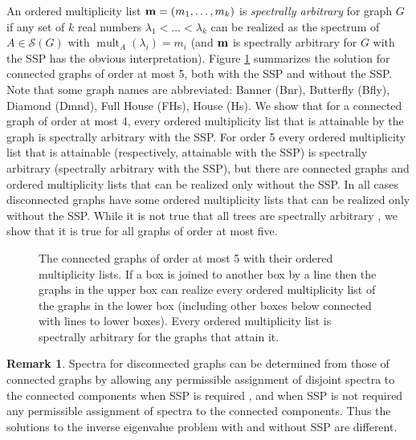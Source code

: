 \documentclass[11pt]{article}
\theoremstyle{definition}
\newtheorem{rem}[thm]{Remark}
\theoremstyle{definition}
\theoremstyle{definition}
\DeclareMathOperator{\mult}{mult}
\newcommand{\oml}{{\bf m}}
\newcommand{\mptn}{\mathcal{S}} %
\begin{document}
An ordered multiplicity list $\oml=(m_1,\dots,m_k)$ is {\em spectrally arbitrary} for graph $G$ if any set of $k$ real numbers $\lambda_1<\dots < \lambda_k$ can be realized as the spectrum of $A\in\mptn(G)$ with $\mult_A(\lambda_i)=m_i$  
(and $\oml$   is spectrally arbitrary for $G$ with the SSP has the obvious interpretation).  Figure \ref{fig:diagram} summarizes the solution for connected graphs of order at most 5, both with the SSP and without the SSP.  Note that some graph names are abbreviated: Banner (Bnr), Butterfly (Bfly), Diamond (Dmnd), Full House (FHs), House (Hs).  We show that for a connected graph of order  at most 4, every ordered multiplicity list that is attainable by the graph is spectrally arbitrary with the SSP.  For order 5 every ordered multiplicity list that is attainable (respectively, attainable with the SSP) is spectrally arbitrary (spectrally arbitrary with the SSP), but there are connected graphs and ordered multiplicity lists that can be realized only without the SSP.  In all cases disconnected graphs have some ordered multiplicity lists that can be realized only without the SSP.
While it is not true that all trees are spectrally arbitrary \cite{BF04}, we show that it is true for all graphs of order at most five.

  \begin{figure}[!h]
\begin{center}
\caption{The connected graphs of order at most 5 with their ordered multiplicity lists.  If a box is joined to another box by a line  then the graphs in the upper box can realize every ordered multiplicity list of the graphs in the lower box (including other boxes below connected with lines to lower boxes). Every ordered multiplicity list is spectrally arbitrary for the graphs that attain it.}\label{fig:diagram}\vspace{-15pt}
\end{center}
\end{figure}



\begin{rem}\label{discon}  Spectra for disconnected graphs can be determined from those of connected graphs by allowing  any permissible assignment of disjoint spectra  to the connected components when SSP is required \cite[Theorem~34]{genSAP}, and when SSP is not required  any permissible assignment of spectra  to the connected components.  Thus the solutions to the inverse eigenvalue problem with and without SSP are different.
\end{rem}
\end{document}

